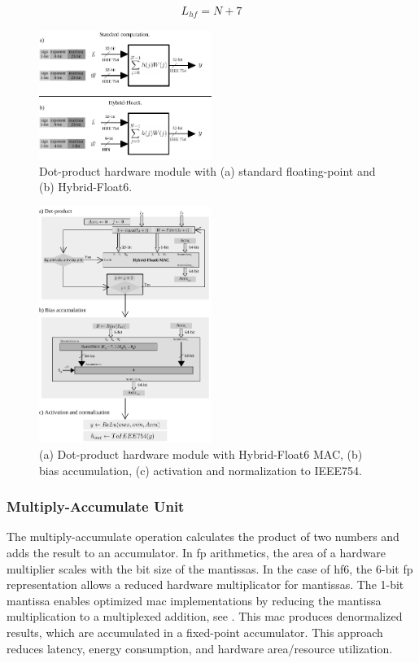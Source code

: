 \begin{eqnarray} \label{eq:dot_custom_float_latency}
L_{hf}=N+7
\end{eqnarray}

\begin{figure}[h!]
	\centering
	\includegraphics[width=0.5\textwidth]{./chapters/cnn_accelerator/figures/dot-product_unit.pdf}
	\caption{Dot-product hardware module with (a) standard floating-point and (b) Hybrid-Float6.}
	\label{fig:dot_product}
\end{figure}

\begin{figure}[h!]
	\centering
	\includegraphics[width=0.5\textwidth]{./chapters/cnn_accelerator/figures/dot_product_hybrid.pdf}
	\caption{(a) Dot-product hardware module with Hybrid-Float6 MAC, (b) bias accumulation, (c) activation and normalization to IEEE754.}
	\label{fig:dot_product_loop}
\end{figure}

\subsubsection{Multiply-Accumulate Unit}
The multiply-accumulate operation calculates the product of two numbers and adds the result to an accumulator. In \gls{fp} arithmetics, the area of a hardware multiplier scales with the bit size of the mantissas. In the case of \gls{hf6}, the 6-bit \gls{fp} representation allows a reduced hardware multiplicator for mantissas. The 1-bit mantissa enables optimized \gls{mac} implementations by reducing the mantissa multiplication to a multiplexed addition, see . This \gls{mac} produces denormalized results, which are accumulated in a fixed-point accumulator. This approach reduces latency, energy consumption, and hardware area/resource utilization.

